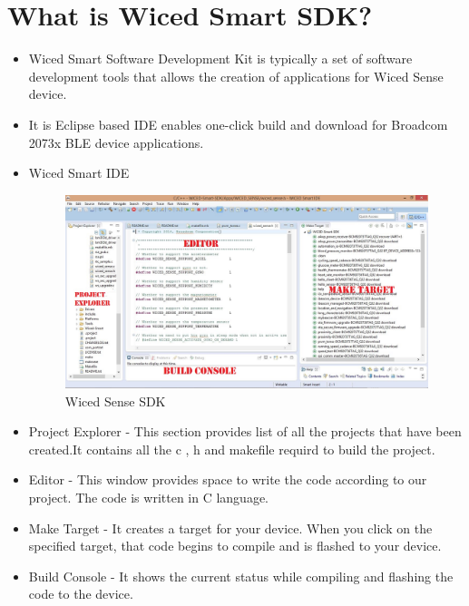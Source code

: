 \documentclass[11pt,a4paper]{article}
\begin{document}
\section{What is Wiced Smart SDK?}
\begin{itemize}
    \item Wiced Smart Software Development Kit is typically a set of software development tools that allows the creation of applications for Wiced Sense device.
    \item It is Eclipse based IDE enables one-click build and download for  Broadcom 2073x BLE device applications. 
    \item Wiced Smart IDE 
    \begin{figure}[h]
    \centering
	\includegraphics[scale=0.4]{Wiced-sdk.JPG}
	\caption{Wiced Sense SDK}
	\end{figure}
	
	\item Project Explorer - This section provides list of all the projects that have been created.It contains all the c , h and makefile requird to build the project.
	\item Editor - This window provides space to write the code according to our project. The code is written in C language.
	\item Make Target - It creates a target for your device. When you click on the specified target, that code begins to compile and is flashed to your device.
	\item Build Console - It shows the current status while compiling and flashing the code to the device.
\end{itemize}

\newpage
\end{document}
